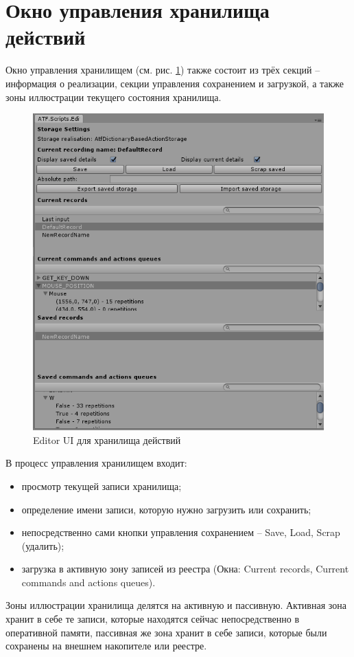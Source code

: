 \section{Окно управления хранилища действий}
Окно управления хранилищем (см. рис. \ref{storageUI}) также состоит из трёх секций -- информация о реализации, секции управления сохранением и загрузкой, а также зоны иллюстрации текущего состояния хранилища.

\begin{figure}[h]
	\centering
	\includegraphics[width=0.7\linewidth]{storage.PNG}
	\caption{Editor UI для хранилища действий}
	\label{storageUI}
\end{figure}

В процесс управления хранилищем входит:
\begin{itemize}
	\item
	просмотр текущей записи хранилища;
	\item
	определение имени записи, которую нужно загрузить или сохранить; 
	\item
	непосредственно сами кнопки управления сохранением -- Save, Load, Scrap (удалить);
	\item
	загрузка в активную зону записей из реестра (Окна: Current records, Current commands and actions queues).
\end{itemize}
Зоны иллюстрации хранилища делятся на активную и пассивную. Активная зона хранит в себе те записи, которые находятся сейчас непосредственно в оперативной памяти, пассивная же зона хранит в себе записи, которые были сохранены на внешнем накопителе или реестре.

